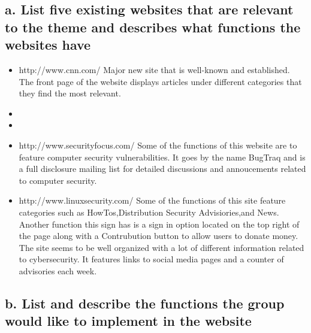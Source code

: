 \documentclass{article}
\begin{document}
\subsection{a. List five existing websites that are relevant to the theme and describes what functions the websites have}
\begin{itemize}
    \item %
    http://www.cnn.com/
    Major new site that is well-known and established.  The front page of the website displays articles under different categories that they find the most relevant.

    \item %
    
    \item %
    
    \item %
    http://www.securityfocus.com/ 
    Some of the functions of this website are to feature computer security vulnerabilities. It goes by the name BugTraq and is a full disclosure mailing list
    for detailed discussions and annoucements related to computer security.
    \item %
    http://www.linuxsecurity.com/
    Some of the functions of this site feature categories such as HowTos,Distribution Security Advisiories,and News.
         Another function this sign has is a sign in option located on the top right of the page along with a Contrubution button to allow users to donate money.
         The site seems to be well organized with a lot of different information related to cybersecurity. 
         It features links to social media pages and a counter of advisories each week.
\end{itemize}



\subsection{b. List and describe the functions the group would like to implement in the website}
\end{document}
